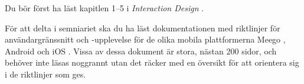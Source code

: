 Du bör först ha läst kapitlen 1--5 i \emph{Interaction Design} 
\citep{Sharp2011idb}.

För att delta i semniariet ska du ha läst dokumentationen med riktlinjer för 
användargränssnitt och -upplevelse för de olika mobila plattformerna Meego 
\citep{Nokia2011n9u}, Android \citep{Android2012d} och iOS \citep{Apple2012hig}.
Vissa av dessa dokument är stora, nästan 200 sidor, och behöver inte läsas 
noggrannt utan det räcker med en översikt för att orientera sig i de riktlinjer 
som ges.
